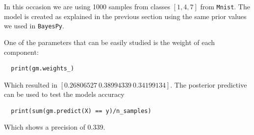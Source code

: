 In this occasion we are using 1000 samples from classes \([1,4,7]\) from \texttt{Mnist}. The model is created as explained in the previous section using the same prior values we used in \texttt{BayesPy}.

One of the parameters that can be easily studied is the weight of each component:
\begin{verbatim}
  print(gm.weights_)
\end{verbatim}
Which resulted in \([0.26806527\  0.38994339\ 0.34199134]\). The posterior predictive can be used to test the models accuracy
\begin{verbatim}
  print(sum(gm.predict(X) == y)/n_samples)
\end{verbatim}
Which shows a precision of 0.339.
